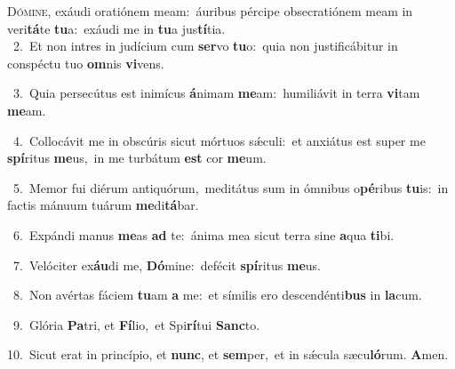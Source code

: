 \lettrine{\initial\textcolor{\initialcolor}{D}}{ómine,} exáudi oratiónem meam:~\dagger áuribus pércipe obsecratiónem meam in veri\-\textbf{tá}\-te \textbf{tu}\-a:~\star exáudi me in \textbf{tu}\-a jus\-\textbf{tí}\-tia.\\
{\numbfont\textcolor{\numbcolor}{~2.}}~Et non intres in judícium cum \textbf{ser}\-vo \textbf{tu}\-o:~\star quia non justificábitur in conspéctu tuo \textbf{om}\-nis \textbf{vi}\-vens.\par
{\numbfont\textcolor{\numbcolor}{~3.}}~Quia persecútus est inimícus \textbf{á}\-nimam \textbf{me}\-am:~\star humiliávit in terra \textbf{vi}\-tam \textbf{me}\-am.\par
{\numbfont\textcolor{\numbcolor}{~4.}}~Collocávit me in obscúris sicut mórtuos sǽculi:~\dagger et anxiátus est super me \textbf{spí}\-ritus \textbf{me}\-us,~\star in me turbátum \textbf{est} cor \textbf{me}\-um.\par
{\numbfont\textcolor{\numbcolor}{~5.}}~Memor fui diérum antiquórum,~\dagger meditátus sum in ómnibus o\-\textbf{pé}\-ribus \textbf{tu}\-is:~\star in factis mánuum tuárum \textbf{me}\-di\-\textbf{tá}\-bar.\par
{\numbfont\textcolor{\numbcolor}{~6.}}~Expándi manus \textbf{me}\-as \textbf{ad} te:~\star ánima mea sicut terra sine \textbf{a}\-qua \textbf{ti}\-bi.\par
{\numbfont\textcolor{\numbcolor}{~7.}}~Velóciter ex\-\textbf{áu}\-di me, \textbf{Dó}\-mine:~\star defécit \textbf{spí}\-ritus \textbf{me}\-us.\par
{\numbfont\textcolor{\numbcolor}{~8.}}~Non avértas fáciem \textbf{tu}\-am \textbf{a} me:~\star et símilis ero descendénti\textbf{bus} in \textbf{la}\-cum.\par
{\numbfont\textcolor{\numbcolor}{~9.}}~Glória \textbf{Pa}\-tri, et \textbf{Fí}\-lio,~\star et Spi\-\textbf{rí}\-tui \textbf{Sanc}\-to.\par
{\numbfont\textcolor{\numbcolor}{10.}}~Sicut erat in princípio, et \textbf{nunc}\-, et \textbf{sem}\-per,~\star et in sǽcula sæcu\-\textbf{ló}\-rum. \textbf{A}\-men.\par
